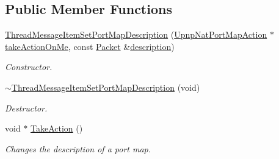 \subsection*{Public Member Functions}
\begin{DoxyCompactItemize}
\item 
\hyperlink{class_thread_message_item_set_port_map_description_aea44c92bb286c134288206c27a80375d}{ThreadMessageItemSetPortMapDescription} (\hyperlink{class_upnp_nat_port_map_action}{UpnpNatPortMapAction} $\ast$\hyperlink{class_thread_message_item_set_port_map_description_a2dd35dc3624f47b32bf2b4942e5601bb}{takeActionOnMe}, const \hyperlink{class_packet}{Packet} \&\hyperlink{class_thread_message_item_set_port_map_description_a3555b193e1583eda3c822b8c7f9d2026}{description})
\begin{DoxyCompactList}\small\item\em Constructor. \item\end{DoxyCompactList}\item 
\hypertarget{class_thread_message_item_set_port_map_description_accc5651f6d19802efea80fb7fcbcf6c0}{
\hyperlink{class_thread_message_item_set_port_map_description_accc5651f6d19802efea80fb7fcbcf6c0}{$\sim$ThreadMessageItemSetPortMapDescription} (void)}
\label{class_thread_message_item_set_port_map_description_accc5651f6d19802efea80fb7fcbcf6c0}

\begin{DoxyCompactList}\small\item\em Destructor. \item\end{DoxyCompactList}\item 
void $\ast$ \hyperlink{class_thread_message_item_set_port_map_description_a96c1ac0e7436f3251f3433155f911104}{TakeAction} ()
\begin{DoxyCompactList}\small\item\em Changes the description of a port map. \item\end{DoxyCompactList}\end{DoxyCompactItemize}
